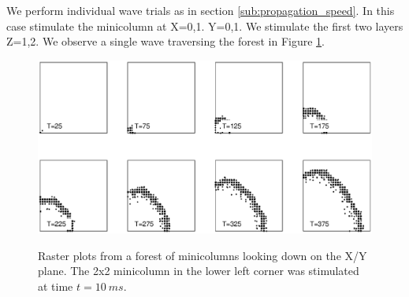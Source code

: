 We perform individual wave trials as in section \ref{sub:propagation_speed}.
In this case stimulate the minicolumn at X={0,1}. Y={0,1}.
We stimulate the first two layers Z={1,2}.
We observe a single wave traversing the forest in Figure \ref{fig:2_5D_Wave}.
\begin{figure}[!htb]
 \caption{ Raster plots from a forest of minicolumns looking down on the X/Y plane. 
           The 2x2 minicolumn in the lower left corner was stimulated at time $t=10\ ms$.}
   \includegraphics[width=\textwidth]{fig/Rasters_2_5D_Wave}
   \label{fig:2_5D_Wave}
\end{figure}


\FloatBarrier


\endinput
